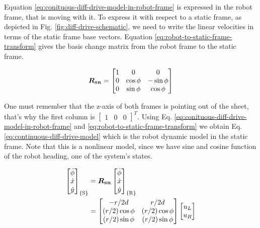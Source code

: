 \documentclass[12pt]{article}
\begin{document}
 Equation \ref{eq:conituous-diff-drive-model-in-robot-frame} is expressed in the robot frame, that is moving with it. To express it with respect to a static frame, as depicted in Fig. \ref{fig:diff-drive-schematic}, we need to write the linear velocities in terms of the static frame base vectors. Equation \ref{eq:robot-to-static-frame-transform} gives the basis change matrix from the robot frame to the static frame.

 \begin{equation}
     \boldsymbol{R_{\mathsmaller{\mathrm{SR}}}} = \begin{bmatrix}
         1 & 0 & 0 \\
         0 & \cos\phi & -\sin\phi \\
         0 & \sin\phi & \cos\phi \\
     \end{bmatrix}
     \label{eq:robot-to-static-frame-transform}
 \end{equation}

 One must remember that the z-axis of both frames is pointing out of the sheet, that's why the first column is $\begin{bmatrix} 1 & 0 & 0 \end{bmatrix}^T$. Using Eq. \ref{eq:conituous-diff-drive-model-in-robot-frame} and \ref{eq:robot-to-static-frame-transform} we obtain Eq. \ref{eq:continuous-diff-drive-model} which is the robot dynamic model in the static frame. Note that this is a nonlinear model, since we have sine and cosine function of the robot heading, one of the system's states.

 \begin{equation}
     \begin{aligned}
     \begin{bmatrix}
         \dot{\phi} \\ \dot{x} \\ \dot{y}
     \end{bmatrix}_{\{\mathrm{S}\}} &= \boldsymbol{R_{\mathsmaller{\mathrm{SR}}}} \begin{bmatrix}
          \dot{\phi} \\ \dot{x} \\ \dot{y}
     \end{bmatrix}_{\{\mathrm{R}\}} \\
     &= \begin{bmatrix}
         -r/2d & r/2d \\
         (r/2)\cos\phi & (r/2)\cos\phi \\
         (r/2)\sin\phi & (r/2)\sin\phi
     \end{bmatrix}  \begin{bmatrix} u_L \\ u_R \end{bmatrix}
     \end{aligned}
     \label{eq:continuous-diff-drive-model}
 \end{equation}
\end{document}
